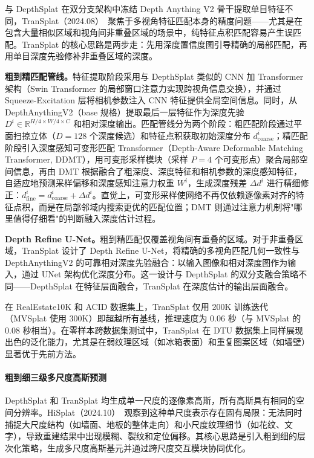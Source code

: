 与 DepthSplat 在双分支架构中冻结 Depth Anything V2 骨干提取单目特征不同，TranSplat（2024.08）~\cite{2408_13770}聚焦于多视角特征匹配本身的精度问题——尤其是在包含大量相似区域和视角间非重叠区域的场景中，纯特征点积匹配容易产生误匹配。TranSplat 的核心思路是两步走：先用深度置信度图引导精确的局部匹配，再用单目深度先验修补非重叠区域的深度。

\textbf{粗到精匹配管线。}特征提取阶段采用与 DepthSplat 类似的 CNN 加 Transformer 架构（Swin Transformer 的局部窗口注意力实现跨视角信息交换），并通过 Squeeze-Excitation 层将相机参数注入 CNN 特征提供全局空间信息。同时，从 DepthAnythingV2（base 规格）提取最后一层特征作为深度先验 $D^i \in \mathbb{R}^{H/4 \times W/4 \times C}$ 和相对深度输出。匹配管线分为两个阶段：粗匹配阶段通过平面扫掠立体（$D{=}128$ 个深度候选）和特征点积获取初始深度分布 $d^i_{\text{coarse}}$；精匹配阶段引入深度感知可变形匹配 Transformer（Depth-Aware Deformable Matching Transformer, DDMT），用可变形采样模块（采样 $P{=}4$ 个可变形点）聚合局部空间信息，再由 DMT 根据融合了粗深度、深度特征和相机参数的深度感知特征，自适应地预测采样偏移和深度感知注意力权重 $W^i$，生成深度残差 $\Delta d^i$ 进行精细修正：$d^i_{\text{fine}} = d^i_{\text{coarse}} + \Delta d^i$。直觉上，可变形采样使网络不再仅依赖逐像素对齐的特征点积，而是在局部邻域内搜索更优的匹配位置；DMT 则通过注意力机制将"哪里值得仔细看"的判断融入深度估计过程。

\textbf{Depth Refine U-Net。}粗到精匹配仅覆盖视角间有重叠的区域。对于非重叠区域，TranSplat 设计了 Depth Refine U-Net，将精确的多视角匹配几何一致性与 DepthAnythingV2 的可靠相对深度先验融合：以输入图像和相对深度图作为输入，通过 UNet 架构优化深度分布。这一设计与 DepthSplat 的双分支融合策略不同——DepthSplat 在特征层面融合，TranSplat 在深度估计的输出层面融合。

在 RealEstate10K 和 ACID 数据集上，TranSplat 仅用 200K 训练迭代（MVSplat 使用 300K）即超越所有基线，推理速度为 0.06 秒（与 MVSplat 的 0.08 秒相当）。在零样本跨数据集测试中，TranSplat 在 DTU 数据集上同样展现出色的泛化能力，尤其是在弱纹理区域（如冰箱表面）和重复图案区域（如墙壁）显著优于先前方法。

\paragraph{粗到细三级多尺度高斯预测}

DepthSplat 和 TranSplat 均生成单一尺度的逐像素高斯，所有高斯具有相同的空间分辨率。HiSplat（2024.10）~\cite{2410_06245}观察到这种单尺度表示存在固有局限：无法同时捕捉大尺度结构（如墙面、地板的整体走向）和小尺度纹理细节（如花纹、文字），导致重建结果中出现模糊、裂纹和定位偏移。其核心思路是引入粗到细的层次化策略，生成多尺度高斯基元并通过跨尺度交互模块协同优化。

